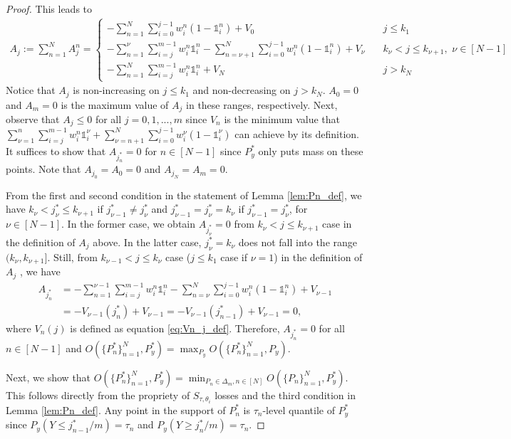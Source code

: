 \documentclass{article}
\newcommand{\one}{\mathds{1}}
\begin{document}
\begin{proof}
This leads to 
\begin{align*}
A_j := \sum_{n=1}^N A_j^n = 
\begin{cases}
-\sum_{n=1}^N \sum_{i=0}^{j-1} w_i^n(1-\one_i^n) + V_0 & \quad j \leq k_1 \\
-\sum_{n=1}^\nu \sum_{i=j}^{m-1} w_i^n \one_i^n - \sum_{n=\nu+1}^{N} \sum_{i=0}^{j-1} w_i^n (1-\one_i^n) + V_\nu & \quad k_\nu < j \leq k_{\nu+1}, \,\, \nu \in [N-1] \\
-\sum_{n=1}^N \sum_{i=j}^{m-1} w_i^n \one_i^n + V_N & \quad j > k_N
\end{cases}
\end{align*}
Notice that $A_j$ is non-increasing on $j \leq k_1$ and non-decreasing on $j > k_N$. $A_0 = 0$ and $A_m = 0$ is the maximum value of $A_j$ in these ranges, respectively. Next, observe that $A_j \leq 0$ for all $j=0,1,...,m$ since $V_n$ is the minimum value that $\sum_{\nu=1}^n \sum_{i=j}^{m-1} w_i^n \one_i^\nu + \sum_{\nu=n+1}^{N} \sum_{i=0}^{j-1} w_i^{\nu} (1-\one_i^{\nu})$ can achieve by its definition. It suffices to show that $A_{j_n^*} = 0$ for $n \in [N-1]$ since $P_y^*$ only puts mass on these points. Note that $A_{j_0} = A_0 = 0$ and $A_{j_N} = A_m = 0$.

From the first and second condition in the statement of Lemma \ref{lem:Pn_def}, we have $k_\nu < j_\nu^* \leq k_{\nu+1}$ if $j_{\nu-1}^* \neq j_\nu^*$ and $j_{\nu-1}^* = j_\nu^*= k_\nu$ if $j_{\nu-1}^* = j_\nu^*$, for $\nu \in [N-1]$. In the former case, we obtain $A_{j_\nu^*} = 0$ from $k_\nu < j \leq k_{\nu+1}$ case in the definition of $A_j$ above. In the latter case, $j_\nu^* = k_\nu$ does not fall into the range $(k_\nu, k_{\nu+1}]$. Still, from $k_{\nu-1} < j \leq k_{\nu}$ case ($j \leq k_1$ case if $\nu=1$) in the definition of $A_j$ , we have
\begin{align*}
A_{j_n^*} 
& = -\sum_{n=1}^{\nu-1} \sum_{i=j}^{m-1} w_i^n \one_i^n - \sum_{n=\nu}^{N} \sum_{i=0}^{j-1} w_i^n (1-\one_i^n) + V_{\nu-1} \\
& =  - V_{\nu-1}(j_n^*) + V_{\nu-1} = -V_{\nu-1}(j_{n-1}^*) + V_{\nu-1} = 0,
\end{align*}
where $V_n(j)$ is defined as equation \eqref{eq:Vn_j_def}. Therefore, $A_{j_n^*} = 0$ for all $n \in [N-1]$ and $O(\{P_n^*\}_{n=1}^N, P_y^*) = \max_{P_y} O(\{P_n^*\}_{n=1}^N, P_y)$.

Next, we show that $O(\{P_n^*\}_{n=1}^N, P_y^*) = \min_{P_n \in \Delta_m, n\in[N]} O(\{P_n\}_{n=1}^N, P_y^*)$. This follows directly from the {\color{red} propriety} of $S_{\tau,\theta_i}$ losses and the third condition in Lemma \ref{lem:Pn_def}. Any point in the support of $P_n^*$ is $\tau_n$-level quantile of $P_y^*$ since $P_y(Y \leq j_{n-1}^*/m) = \tau_n$ and $P_y(Y \geq j_n^*/m) = \tau_n$.


\end{proof}
\end{document}
